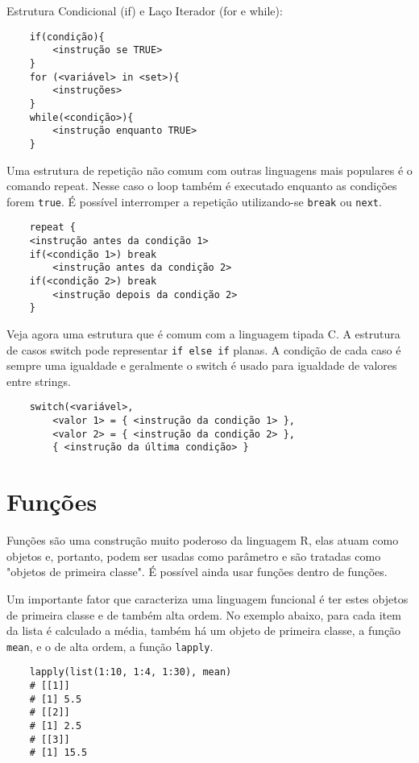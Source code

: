 \documentclass[12pt]{article}
\begin{document}
Estrutura Condicional (if) e Laço Iterador (for e while):

\begin{verbatim}
    if(condição){
        <instrução se TRUE>
    }
    for (<variável> in <set>){
        <instruções>
    }
    while(<condição>){
        <instrução enquanto TRUE>
    }
\end{verbatim}

Uma estrutura de repetição não comum com outras linguagens mais populares é o comando repeat. Nesse caso o loop também é executado enquanto as condições forem \texttt{true}. É possível interromper a repetição utilizando-se \texttt{break} ou \texttt{next}.

\begin{verbatim}
    repeat {
    <instrução antes da condição 1>
    if(<condição 1>) break
        <instrução antes da condição 2>
    if(<condição 2>) break
        <instrução depois da condição 2>
    }
\end{verbatim}

Veja agora uma estrutura que é comum com a linguagem tipada C. A estrutura de casos switch pode representar \texttt{if else if} planas. A condição de cada caso é sempre uma igualdade e geralmente o switch é usado para igualdade de valores entre strings.

\begin{verbatim}
    switch(<variável>,
        <valor 1> = { <instrução da condição 1> },
        <valor 2> = { <instrução da condição 2> },
        { <instrução da última condição> }
\end{verbatim}

\section{Funções} \label{sec:Funções}

Funções são uma construção muito poderoso da linguagem R, elas atuam como objetos e, portanto, podem ser usadas como parâmetro e são tratadas como "objetos de primeira classe". É possível ainda usar funções dentro de funções.

Um importante fator que caracteriza uma linguagem funcional é ter estes objetos de primeira classe e de também alta ordem. No exemplo abaixo, para cada item da lista é calculado a média, também há um objeto de primeira classe, a função \texttt{mean}, e o de alta ordem, a função \texttt{lapply}.

\begin{verbatim}
    lapply(list(1:10, 1:4, 1:30), mean)
    # [[1]]
    # [1] 5.5
    # [[2]]
    # [1] 2.5
    # [[3]]
    # [1] 15.5
\end{verbatim}
\end{document}
